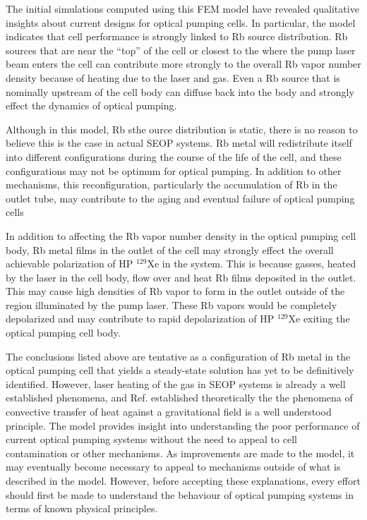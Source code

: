 The initial simulations computed using this FEM model have revealed qualitative insights about current designs for optical pumping cells. In particular, the model indicates that cell performance is strongly linked to Rb source distribution. Rb sources that are near the ``top'' of the cell or closest to the where the pump laser beam enters the cell can contribute more strongly to the overall Rb vapor number density because of heating due to the laser and gas. Even a Rb source that is nominally upstream of the cell body can diffuse back into the body and strongly effect the dynamics of optical pumping. 

Although in this model, Rb sthe ource distribution is static, there is no reason to believe this is the case in actual SEOP systems. Rb metal will redistribute itself into different configurations during the course of the life of the cell, and these configurations may not be optimum for optical pumping. In addition to other mechanisms, this reconfiguration, particularly the accumulation of Rb in the outlet tube, may contribute to the aging and eventual failure of optical pumping cells

In addition to affecting the Rb vapor number density in the optical pumping cell body, Rb metal films in the outlet of the cell may strongly effect the overall achievable polarization of HP $^{129}$Xe in the system. This is because gasses, heated by the laser in the cell body, flow over and heat Rb films deposited in the outlet. This may cause high densities of Rb vapor to form in the outlet outside of the region illuminated by the pump laser. These Rb vapors would be completely depolarized and may contribute to rapid depolarization of HP $^{129}$Xe exiting the optical pumping cell body.

The conclusions listed above are tentative as a configuration of Rb metal in the optical pumping cell that yields a steady-state solution has yet to be definitively identified. However, laser heating of the gas in SEOP systems is already a well established phenomena\cite{Ruset2005}, and Ref. \cite{Fink2005} established theoretically the the phenomena of convective transfer of heat against a gravitational field is a well understood principle. The model provides insight into understanding the poor performance of current optical pumping systems without the need to appeal to cell contamination or other mechanisms. As improvements are made to the model, it may eventually become necessary to appeal to mechanisms outside of what is described in the model. However, before accepting these explanations, every effort should first be made to understand the behaviour of optical pumping systems in terms of known physical principles. 